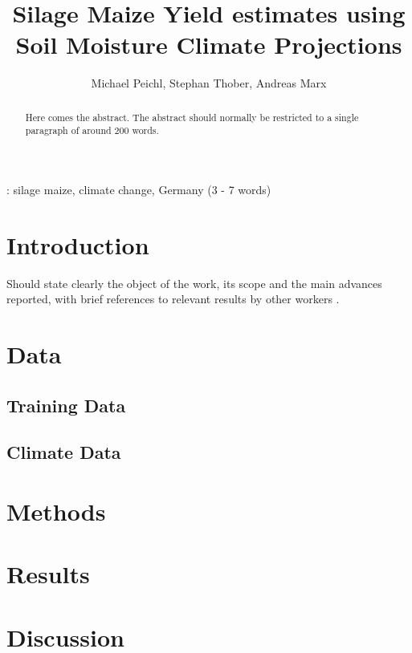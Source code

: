 \documentclass[12pt]{iopart}
\begin{document}
	
\title[Silage Maize Yield estimates using Soil Moisture Climate Projections]{Silage Maize Yield estimates using Soil Moisture Climate Projections}
\author{Michael Peichl, Stephan Thober, Andreas Marx}

\address{UFZ - Helmholtz Centre for Environmental Research, Leipzig, Germany}

\begin{abstract}
Here comes the abstract. The abstract should normally be restricted to a single paragraph of around 200 words.



\end{abstract}

: silage maize, climate change, Germany (3 - 7 words)


\submitto{\ERL}
\maketitle
	

\section{Introduction}
Should state clearly the object of the work, its scope and the main advances reported, with brief references to relevant
results by other workers   \cite{Brouwer2012, Schlenker2009}.

\section{Data}
\subsection{Training Data}
\subsection{Climate Data}
\section{Methods}
\section{Results}
\section{Discussion}

{}

	
\end{document}
